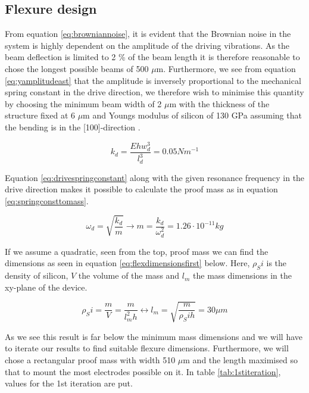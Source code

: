 \documentclass[12pt,a4paper,titlepage]{article}
\begin{document}
\begin{spacing}{1.1}
\subsection{Flexure design}
From equation \ref{eq:browniannoise}, it is evident that the Brownian noise in the system is highly dependent on the amplitude of the driving vibrations. As the beam deflection is limited to 2 \% of the beam length it is therefore reasonable to chose the longest possible beams of 500 $\mu$m. Furthermore, we see from equation \ref{eq:yamplitudeast} that the amplitude is inversely proportional to the mechanical spring constant in the drive direction, we therefore wish to minimise this quantity by choosing the minimum beam width of 2 $\mu$m with the thickness of the structure fixed at 6 $\mu$m and Youngs modulus of silicon of 130 GPa assuming that the bending is in the [100]-direction \supercite{Bhushan97}.

\begin{equation}
k_d = \dfrac{E h w_d^3}{l_d^3}= 0.05 Nm^{-1}
\label{eq:drivespringconstant}
\end{equation}

Equation \ref{eq:drivespringconstant} along with the given resonance frequency in the drive direction makes it possible to calculate the proof mass as in equation \ref{eq:springconsttomass}.

\begin{equation}
\omega_d = \sqrt{\dfrac{k_d}{m}} \rightarrow m = \dfrac{k_d}{\omega_d^2} = 1.26 \cdot 10^{-11} kg
\label{eq:springconsttomass}
\end{equation}

If we assume a quadratic, seen from the top, proof mass we can find the dimensions as seen in  equation \ref{eq:flexdimensionsfirst} below. Here, $\rho_Si$ is the density of silicon, $V$ the volume of the mass and $l_m$ the mass dimensions in the xy-plane of the device.

\begin{equation}
\rho_Si = \dfrac{m}{V} = \dfrac{m}{l_m^2 h} \leftrightarrow l_m = \sqrt{\dfrac{m}{\rho_Si h}} = 30 \mu m
\label{eq:flexdimensionsfirst}
\end{equation}

As we see this result is far below the minimum mass dimensions and we will have to iterate our results to find suitable flexure dimensions. Furthermore, we will chose a rectangular proof mass with width 510 $\mu$m and the length maximised so that to mount the most electrodes possible on it. In table \ref{tab:1stiteration}, values for the 1st iteration are put.


\end{spacing}
\end{document}
